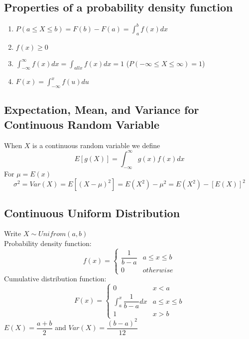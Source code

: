 \documentclass[11pt]{article}
\begin{document}
\subsection{Properties of a probability density function}
\begin{enumerate}
    \item $\displaystyle P(a\leq X\leq b) = F(b) - F(a) = \int_{a}^{b}f(x)dx$
    \item $f(x)\geq 0$
    \item $\displaystyle\int_{-\infty}^{\infty}f(x)dx = \int_{all x}f(x)dx = 1$ ($P(-\infty\leq X\leq\infty) = 1$)
    \item $F(x) = \displaystyle\int_{-\infty}^{x}f(u)du$
\end{enumerate}
\subsection{Expectation, Mean, and Variance for Continuous Random Variable}
When $X$ is a continuous random variable we define \[E[g(X)] = \int_{-\infty}^{\infty}g(x)f(x)dx\]
For $\mu = E(x)$ \[\sigma^2 = Var(X) = E[(X-\mu)^2] = E(X^2) - \mu^2 = E(X^2) - [E(X)]^2\]
\subsection{Continuous Uniform Distribution}
Write $X\sim Unifrom(a,b)$ \\
Probability density function: \[f(x) = \begin{cases}
    \dfrac{1}{b-a} &a\leq x\leq b \\0 &otherwise
\end{cases}\]
Cumulative distribution function: \[F(x) = \begin{cases}
    0 &x<a \\\displaystyle\int_{a}^{x}\dfrac{1}{b-a}dx &a\leq x\leq b \\1&x>b
\end{cases}\]
$E(X) = \dfrac{a+b}{2}$ and $Var(X) = \dfrac{(b-a)^2}{12}$
\end{document}
